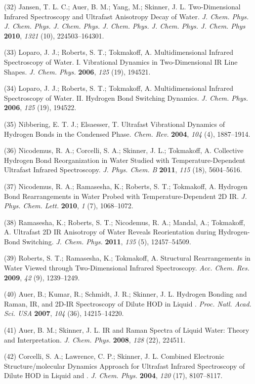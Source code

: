 \documentclass[]{article}
\begin{document}
(32) Jansen, T. L. C.; Auer, B. M.; Yang, M.; Skinner, J. L.  Two-Dimensional Infrared Spectroscopy and Ultrafast Anisotropy Decay of Water. \emph{J. Chem. Phys. J. Chem. Phys. J. Chem. Phys. J. Chem. Phys.  J. Chem. Phys. J. Chem. Phys} \textbf{2010}, \emph{1321} (10), 224503--164301.

(33) Loparo, J. J.; Roberts, S. T.; Tokmakoff, A. Multidimensional Infrared Spectroscopy of Water. I. Vibrational Dynamics in Two-Dimensional IR Line Shapes. \emph{J. Chem. Phys.} \textbf{2006}, \emph{125} (19), 194521.

(34) Loparo, J. J.; Roberts, S. T.; Tokmakoff, A. Multidimensional Infrared Spectroscopy of Water. II. Hydrogen Bond Switching Dynamics.  \emph{J. Chem. Phys.} \textbf{2006}, \emph{125} (19), 194522.

(35) Nibbering, E. T. J.; Elsaesser, T. Ultrafast Vibrational Dynamics of Hydrogen Bonds in the Condensed Phase. \emph{Chem. Rev.}  \textbf{2004}, \emph{104} (4), 1887--1914.

(36) Nicodemus, R. A.; Corcelli, S. A.; Skinner, J. L.; Tokmakoff, A.  Collective Hydrogen Bond Reorganization in Water Studied with Temperature-Dependent Ultrafast Infrared Spectroscopy. \emph{J. Phys.  Chem. B} \textbf{2011}, \emph{115} (18), 5604--5616.

(37) Nicodemus, R. A.; Ramasesha, K.; Roberts, S. T.; Tokmakoff, A.  Hydrogen Bond Rearrangements in Water Probed with Temperature-Dependent 2D IR. \emph{J. Phys. Chem. Lett.} \textbf{2010}, \emph{1} (7), 1068--1072.

(38) Ramasesha, K.; Roberts, S. T.; Nicodemus, R. A.; Mandal, A.; Tokmakoff, A. Ultrafast 2D IR Anisotropy of Water Reveals Reorientation during Hydrogen-Bond Switching. \emph{J. Chem. Phys.} \textbf{2011}, \emph{135} (5), 12457--54509.

(39) Roberts, S. T.; Ramasesha, K.; Tokmakoff, A. Structural Rearrangements in Water Viewed through Two-Dimensional Infrared Spectroscopy. \emph{Acc. Chem. Res.} \textbf{2009}, \emph{42} (9), 1239--1249.

(40) Auer, B.; Kumar, R.; Schmidt, J. R.; Skinner, J. L. Hydrogen Bonding and Raman, IR, and 2D-IR Spectroscopy of Dilute HOD in Liquid . \emph{Proc. Natl. Acad. Sci. USA} \textbf{2007}, \emph{104} (36), 14215--14220.

(41) Auer, B. M.; Skinner, J. L. IR and Raman Spectra of Liquid Water: Theory and Interpretation. \emph{J. Chem. Phys.} \textbf{2008}, \emph{128} (22), 224511.

(42) Corcelli, S. A.; Lawrence, C. P.; Skinner, J. L. Combined Electronic Structure/molecular Dynamics Approach for Ultrafast Infrared Spectroscopy of Dilute HOD in Liquid  and . \emph{J. Chem. Phys.} \textbf{2004}, \emph{120} (17), 8107--8117.
\end{document}
